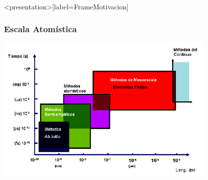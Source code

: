 %

\mode*
\begin{frame}<presentation>[label=FrameMotivacion]
  \frametitle{Escala Atomística}

  \centering

  \includegraphics[width=0.8\textwidth]{Figures/Escalas.png}

\end{frame}




